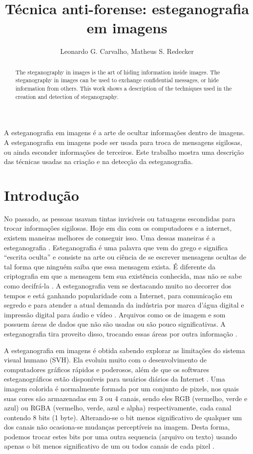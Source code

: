 \documentclass[12pt]{article}
\title{Técnica anti-forense: esteganografia em imagens}
\author{Leonardo G. Carvalho\inst{1}, Matheus S. Redecker\inst{1}}
\begin{document}
 

\maketitle

\begin{abstract}
The steganography in images is the art of hiding information inside images. The steganography in images can be used to exchange confidential messages, or hide information from others. This work shows a description of the techniques used in the creation and detection of steganography.
\end{abstract}

\begin{resumo} 
A esteganografia em imagens é a arte de ocultar informações dentro de imagens. A esteganografia em imagens pode ser usada para troca de mensagens sigilosas, ou ainda esconder informações de terceiros. Este trabalho mostra uma descrição das técnicas usadas na criação e na detecção da esteganografia. 
\end{resumo}

\section{Introdução}
No passado, as pessoas usavam tintas invisíveis ou tatuagens escondidas para trocar informações sigilosas. Hoje em dia com os computadores e a internet, existem maneiras melhores de conseguir isso. Uma dessas maneiras é a esteganografia \cite{hideAndSeek}. Esteganografia é uma palavra que vem do grego e significa “escrita oculta” e consiste na arte ou ciência de se escrever mensagens ocultas de tal forma que ninguém saiba que essa mensagem exista. É diferente da criptografia em que a mensagem tem sua existência conhecida, mas não se sabe como decifrá-la \cite{newton}. A esteganografia vem se destacando muito no decorrer dos tempos e está ganhando popularidade com a Internet, para comunicação em segredo e para atender a atual demanda da indústria por marca d’água digital e impressão digital para áudio e vídeo \cite{tcc}. Arquivos como os de imagem e som possuem áreas de dados que não são usadas ou são pouco significativas. A esteganografia tira proveito disso, trocando essas áreas por outra informação \cite{ufrgs}. 

A esteganografia em imagens é obtida sabendo explorar as limitações do sistema visual humano (SVH). Ela evoluiu muito com o desenvolvimento de computadores gráficos rápidos e poderosos, além de que os softwares esteganográficos estão disponíveis para usuários diários da Internet \cite{tcc}. Uma imagem colorida é normalmente formada por um conjunto de pixels, nos quais suas cores são armazenadas em 3 ou 4 canais, sendo eles RGB (vermelho, verde e azul) ou RGBA (vermelho, verde, azul e alpha) respectivamente, cada canal contendo 8 bits (1 byte). Alterando-se o bit menos significativo de qualquer um dos canais não ocasiona-se mudanças perceptíveis na imagem. Desta forma, podemos trocar estes bits por uma outra sequencia (arquivo ou texto) usando apenas o bit menos significativo de um ou todos canais de cada pixel \cite{ufrgs, tcc}.
\end{document}
